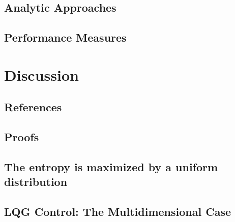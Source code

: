 \documentclass[justified,notitlepage]{tufte-book}
\begin{document}
\section{Analytic Approaches}

\section{Performance Measures}

\chapter{Discussion}

\section{References}
{}


\begin{appendices}

\chapter{Proofs}
\section{The entropy is maximized by a uniform distribution}
\label{app:entropy}

\section{LQG Control: The Multidimensional Case}
\label{app:lqg}

\end{appendices}
\end{document}
